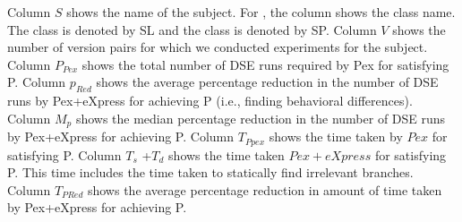 Column $S$ shows the name of the subject. For , the column shows the class name. The class  is denoted by SL and the class  is denoted by SP. 
Column $V$ shows the number of version pairs for which we conducted experiments for the subject. 
Column $P_{Pex}$ shows the total number of DSE runs required by Pex for satisfying P. 
Column $p_{Red}$ shows the average percentage reduction in the number of DSE runs by Pex+eXpress for achieving P (i.e., finding behavioral differences). 
Column $M_p$ shows the median percentage reduction in the number of DSE runs by Pex+eXpress for achieving P.
Column $T_{Ppex}$ shows the time taken by $Pex$ for satisfying P.
Column $T_s$ +$T_d$ shows the time taken $Pex+eXpress$ for satisfying P. This time includes the time taken to statically find irrelevant branches. 
Column $T_{PRed}$ shows the average percentage reduction in amount of time taken by Pex+eXpress for achieving P. 




